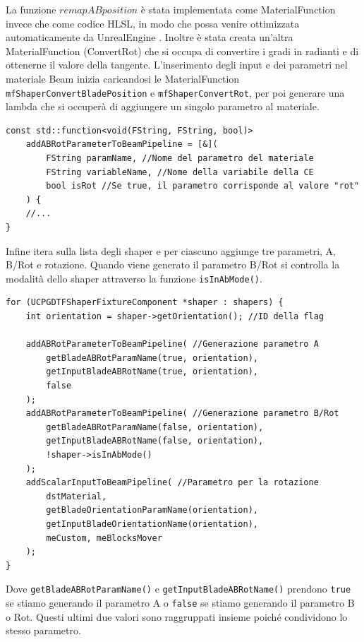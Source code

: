 \documentclass[main.tex]{subfiles}
\begin{document}
La funzione $remapABposition$ è stata implementata come MaterialFunction invece che come codice HLSL, in modo che possa venire ottimizzata automaticamente da UnrealEngine \cite{hlslNoOptimize}. Inoltre è stata creata un'altra MaterialFunction (ConvertRot) che si occupa di convertire i gradi in radianti e di ottenerne il valore della tangente. L'inserimento degli input e dei parametri nel materiale Beam inizia caricandosi le MaterialFunction \lstinline{mfShaperConvertBladePosition} e \lstinline{mfShaperConvertRot}, per poi generare una lambda che si occuperà di aggiungere un singolo parametro al materiale.
\begin{lstlisting}
const std::function<void(FString, FString, bool)>
    addABRotParameterToBeamPipeline = [&](
        FString paramName, //Nome del parametro del materiale
        FString variableName, //Nome della variabile della CE
        bool isRot //Se true, il parametro corrisponde al valore "rot"
    ) {
    //...
}
\end{lstlisting}
Infine itera sulla lista degli shaper e per ciascuno aggiunge tre parametri, A, B/Rot e rotazione. Quando viene generato il parametro B/Rot si controlla la modalità dello shaper attraverso la funzione \lstinline{isInAbMode()}.
\begin{lstlisting}
for (UCPGDTFShaperFixtureComponent *shaper : shapers) {
    int orientation = shaper->getOrientation(); //ID della flag

    addABRotParameterToBeamPipeline( //Generazione parametro A
        getBladeABRotParamName(true, orientation),
        getInputBladeABRotName(true, orientation),
        false
    );
    addABRotParameterToBeamPipeline( //Generazione parametro B/Rot
        getBladeABRotParamName(false, orientation),
        getInputBladeABRotName(false, orientation),
        !shaper->isInAbMode()
    );
    addScalarInputToBeamPipeline( //Parametro per la rotazione
        dstMaterial,
        getBladeOrientationParamName(orientation),
        getInputBladeOrientationName(orientation),
        meCustom, meBlocksMover
    );
}
\end{lstlisting}
Dove \lstinline{getBladeABRotParamName()} e \lstinline{getInputBladeABRotName()} prendono \lstinline{true} se stiamo generando il parametro A o \lstinline{false} se stiamo generando il parametro B o Rot. Questi ultimi due valori sono raggruppati insieme poiché condividono lo stesso parametro. \newline
\end{document}
